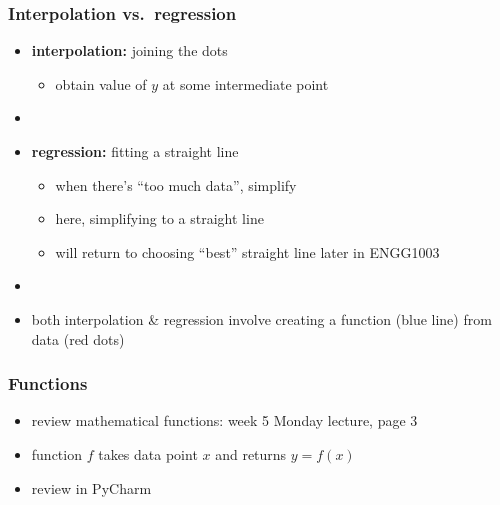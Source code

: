 \documentclass[english,14pt]{beamer}
\newcommand\red[1]{{\color{red} #1}}
\newcommand\blue[1]{{\color{blue} #1}}
\begin{document}

\begin{frame}[fragile]

\frametitle{Interpolation vs.\ regression}

\begin{itemize}
	\item \textbf{interpolation:} joining the dots
	\begin{itemize}
		\item obtain value of $y$ at some intermediate point
	\end{itemize}
	\item[]
	\item \textbf{regression:} fitting a straight line
	\begin{itemize}
		\item when there's ``too much data'', simplify
		\item here, simplifying to a straight line
		\item will return to choosing ``best'' straight line later in ENGG1003
	\end{itemize}
	\item[]
	\item both interpolation \& regression involve creating a function \blue{(blue line)} from data \red{(red dots)}
\end{itemize}

\end{frame}


\begin{frame}[fragile]

\frametitle{Functions}

\begin{itemize}

	\item review mathematical functions: week 5 Monday lecture, page 3
	\item function $f$ takes data point $x$ and returns $y = f(x)$
	\item review in PyCharm
\end{itemize}

\end{frame}
\end{document}
